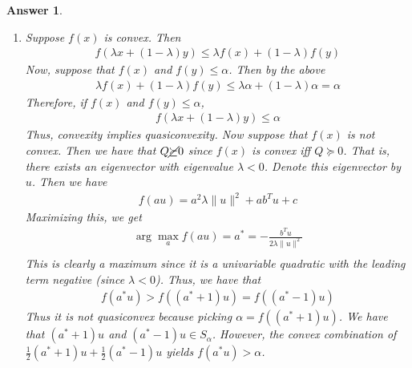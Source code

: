 \documentclass[12pt]{article}
\theoremstyle{colon}
\newtheorem*{answer}{Answer}
\begin{document}
\begin{answer}
\begin{enumerate}[label=\roman*)]
    \item Suppose $f(x)$ is convex. Then
      \begin{gather*}
        f(\lambda x + (1-\lambda)y ) \leq \lambda f(x) + (1-\lambda) f(y)
      \end{gather*}
      Now, suppose that $f(x)$ and $f(y) \leq \alpha$. Then by the above
      \begin{gather*}
        \lambda f(x) + (1-\lambda) f(y) \leq \lambda \alpha + (1-\lambda) \alpha = \alpha
      \end{gather*}
      Therefore, if $f(x)$ and $f(y) \leq \alpha$,
      \begin{gather*}
        f(\lambda x + (1-\lambda)y ) \leq \alpha
      \end{gather*}
      Thus, convexity implies quasiconvexity. Now suppose that $f(x)$ is not convex. Then we have that $Q \cancel{\succeq} 0$ since $f(x)$ is convex iff $Q \succeq 0$. That is, there exists an eigenvector with eigenvalue $\lambda < 0$. Denote this eigenvector by $u$. Then we have
      \begin{gather*}
        f(a u) = a^2 \lambda \lVert u \rVert^2 + a b^T u + c
      \end{gather*}
      Maximizing this, we get
      \begin{gather*}
        \arg\max_a f(a u) = a^* =  - \frac{b^T u}{2 \lambda \lVert u \rVert^2 } \\
      \end{gather*}
      This is clearly a maximum since it is a univariable quadratic with the leading term negative (since $\lambda < 0$). Thus, we have that
      \begin{gather*}
        f(a^* u) > f((a^* + 1) u) = f((a^* - 1) u)
      \end{gather*}
      Thus it is not quasiconvex because picking $\alpha = f((a^* + 1) u)$. We have that $(a^* + 1) u$ and $(a^* - 1) u \in S_\alpha$. However, the convex combination of $\frac{1}{2}(a^* + 1) u + \frac{1}{2}(a^* - 1) u$ yields $f(a^* u) > \alpha$.
  \end{enumerate}
\end{answer}

\clearpage
\end{document}
